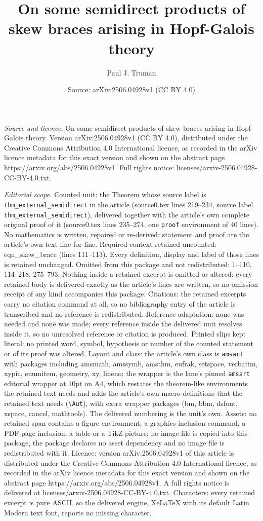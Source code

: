 \documentclass[10pt,a4paper]{amsart}
\title[On some semidirect products of skew braces arising in Hopf-G]{On some semidirect products of skew braces arising in Hopf-Galois theory}
\author{Paul J. Truman}
\date{Source: arXiv:2506.04928v1 (CC BY 4.0)}
\begin{document}
\maketitle

\noindent\emph{Source and licence.} On some semidirect products of skew braces arising in Hopf-Galois theory. Version arXiv:2506.04928v1 (CC BY 4.0), distributed under the Creative Commons Attribution 4.0 International licence, as recorded in the arXiv licence metadata for this exact version and shown on the abstract page https://arxiv.org/abs/2506.04928v1. Full rights notice: licenses/arxiv-2506.04928-CC-BY-4.0.txt.\par\smallskip

\noindent\textit{Editorial scope.} Counted unit: the Theorem whose source label is \texttt{thm\_external\_semidirect} in the article (source0.tex lines 219--234, source label \texttt{thm\_external\_semidirect}), delivered together with the article's own complete original proof of it (source0.tex lines 235--274, one \texttt{proof} environment of 40 lines). No mathematics is written, repaired or re-derived: statement and proof are the article's own text line for line. Required context retained uncounted: eqn\_skew\_brace (lines 111--113). Every definition, display and label of those lines is retained unchanged. Omitted from this package and not redistributed: 1--110, 114--218, 275--793. Nothing inside a retained excerpt is omitted or altered: every retained body is delivered exactly as the article's lines are written, so no omission receipt of any kind accompanies this package. Citations: the retained excerpts carry no citation command at all, so no bibliography entry of the article is transcribed and no reference is redistributed. Reference adaptation: none was needed and none was made; every reference inside the delivered unit resolves inside it, so no unresolved reference or citation is produced. Printed slips kept literal: no printed word, symbol, hypothesis or number of the counted statement or of its proof was altered. Layout and class: the article's own class is \texttt{amsart} with packages including amsmath, amssymb, amsthm, eufrak, setspace, verbatim, xypic, enumitem, geometry, xy, lineno; the wrapper is the lane's pinned \texttt{amsart} editorial wrapper at 10pt on A4, which restates the theorem-like environments the retained text needs and adds the article's own macro definitions that the retained text needs (\texttt{\textbackslash Aut}), with extra wrapper packages (bm, bbm, dsfont, xspace, cancel, mathtools). The delivered numbering is the unit's own. Assets: no retained span contains a figure environment, a graphics-inclusion command, a PDF-page inclusion, a table or a TikZ picture; no image file is copied into this package, the package declares no asset dependency and no image file is redistributed with it. Licence: version arXiv:2506.04928v1 of this article is distributed under the Creative Commons Attribution 4.0 International licence, as recorded in the arXiv licence metadata for this exact version and shown on the abstract page https://arxiv.org/abs/2506.04928v1. A full rights notice is delivered at licenses/arxiv-2506.04928-CC-BY-4.0.txt. Characters: every retained excerpt is pure ASCII, so the delivered engine, XeLaTeX with its default Latin Modern text font, reports no missing character.
\end{document}
